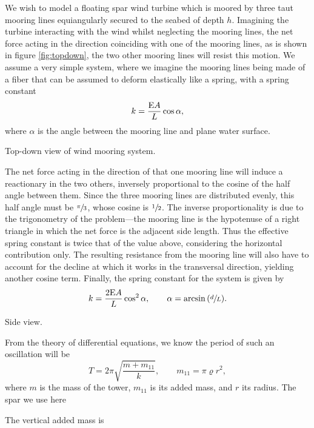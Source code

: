 We wish to model a floating spar wind turbine which is moored by three taut mooring lines equiangularly secured to the seabed of depth $h$.
Imagining the turbine interacting with the wind whilst neglecting the mooring lines, the net force acting in the direction coinciding with one of the mooring lines, as is shown in figure \ref{fig:topdown}, the two other mooring lines will resist this motion.
We assume a very simple system, where we imagine the mooring lines being made of a fiber that can be assumed to deform elastically like a spring, with a spring constant
\[
    k = \frac{\mathrm{E} A}{L}\cos{\alpha},
\]
where $\alpha$ is the angle between the mooring line and plane water surface.
\begin{Figure}
    \centering
    \captionsetup{type = figure}
    
    \caption{Top-down view of wind mooring system.}
    \label{fig:topdown}
\end{Figure}
\noindent
The net force acting in the direction of that one mooring line will induce a reactionary in the two others, inversely proportional to the cosine of the half angle between them.
Since the three mooring lines are distributed evenly, this half angle must be $\sfrac{\pi}{3}$, whose cosine is $\sfrac{1}{2}$.
The inverse proportionality is due to the trigonometry of the problem---the mooring line is the hypotenuse of a right triangle in which the net force is the adjacent side length.
Thus the effective spring constant is twice that of the value above, considering the horizontal contribution only.
The resulting resistance from the mooring line will also have to account for the decline at which it works in the transversal direction, yielding another cosine term.
Finally, the spring constant for the system is given by
\[
    k = \frac{2 \mathrm{E} A}{L} \cos^2{\alpha}, \qquad \alpha = \arcsin{(\sfrac{d}{L})}.
\]
\begin{Figure}
    \centering
    \captionsetup{type = figure}
    
    \caption{Side view.}
    \label{fig:side}
\end{Figure}
From the theory of differential equations, we know the period of such an oscillation will be
\[
    T = 2\pi \sqrt{\frac{m + m_11}{k}}, \qquad m_11 = \pi \varrho r^2,
\]
where $m$ is the mass of the tower, $m_11$ is its added mass, and $r$ its radius.
The spar we use here 

The vertical added mass is 